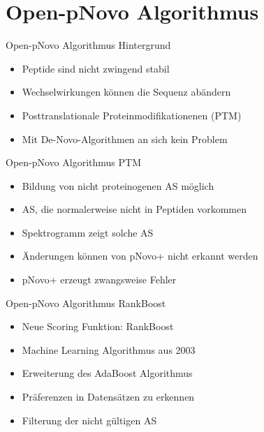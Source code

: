 \documentclass{beamer}
\newcommand{\dashAndSpace}{\textendash \space}
\begin{document}
    \section{Open-pNovo Algorithmus}
    \begin{frame}{Open-pNovo Algorithmus \dashAndSpace Hintergrund}
     \begin{itemize}
      \item<1-> Peptide sind nicht zwingend stabil
      \item<2-> Wechselwirkungen können die Sequenz abändern
      \item<3-> Posttranslationale Proteinmodifikationenen (PTM)
      \item<4-> Mit De-Novo-Algorithmen an sich kein Problem
     \end{itemize}
    \end{frame}

    \begin{frame}{Open-pNovo Algorithmus \dashAndSpace PTM}
     \begin{itemize}
      \item<1-> Bildung von nicht proteinogenen AS möglich
      \item<2-> AS, die normalerweise nicht in Peptiden vorkommen
      \item<3-> Spektrogramm zeigt solche AS
      \item<4-> Änderungen können von pNovo+ nicht erkannt werden
      \end{itemize}
      \begin{itemize}
      \item<5-> pNovo+ erzeugt zwangsweise Fehler
     \end{itemize}
    \end{frame}

      \begin{frame}{Open-pNovo Algorithmus \dashAndSpace RankBoost}
     \begin{itemize}
      \item<1-> Neue Scoring Funktion: RankBoost
      \item<2-> Machine Learning Algorithmus aus 2003
      \item<3-> Erweiterung des AdaBoost Algorithmus
      \item<4-> Präferenzen in Datensätzen zu erkennen
      \end{itemize}
      \begin{itemize}
      \item<5-> Filterung der nicht gültigen AS
     \end{itemize}
    \end{frame}
\end{document}
